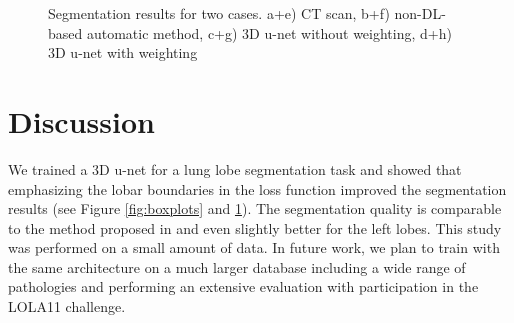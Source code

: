 \documentclass{midl} %
\begin{document}
\begin{figure}[htbp]

\caption{Segmentation results for two cases. a+e) CT scan, b+f) non-DL-based automatic method, c+g) 3D u-net without weighting, d+h) 3D u-net with weighting}
\label{screenshots}
\end{figure}
\vspace{-6mm}
\section{Discussion}
We trained a 3D u-net for a lung lobe segmentation task and showed that emphasizing the lobar boundaries in the loss function improved the segmentation results (see Figure \ref{fig:boxplots} and \ref{screenshots}). The segmentation quality is comparable to the method proposed in \cite{lassen2013} and even slightly better for the left lobes. 
This study was performed on a small amount of data. In future work, we plan to train with the same architecture on a much larger database including a wide range of pathologies and performing an extensive evaluation with participation in the LOLA11 \cite{LOLA11} challenge. %












\end{document}
